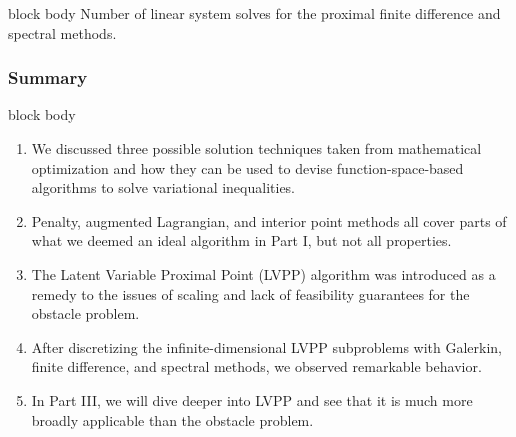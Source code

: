 \documentclass[aspectratio=169,xcolor=dvipsnames,11pt]{beamer}
\begin{document}
\begin{frame}
{\begin{minipage}{0.7\linewidth}
\begin{beamercolorbox}[rounded=true, shadow=true, wd=\textwidth]{block body}
\scriptsize
Number of linear system solves for the proximal finite difference and spectral methods.
\end{beamercolorbox}
\end{minipage}%
\begin{minipage}{0.3\linewidth}
 \centering
\begin{figure}
	\centering
\end{figure}
\end{minipage}
}
 \end{frame}

\begin{frame}\frametitle{Summary}
\begin{beamercolorbox}[rounded=true, shadow=true, wd=\textwidth]{block body}
\begin{enumerate}
\item We discussed three possible solution techniques taken from mathematical optimization and how they can be used to devise function-space-based algorithms to solve variational inequalities.
\item Penalty, augmented Lagrangian, and interior point methods all cover parts of what we deemed an ideal algorithm in Part I, but not all properties.
\item The Latent Variable Proximal Point (LVPP) algorithm was introduced as a remedy to the issues of scaling and lack of feasibility guarantees for the obstacle problem.
\item After discretizing the infinite-dimensional LVPP subproblems with Galerkin, finite difference, and spectral methods, we observed remarkable behavior.
\item In Part III, we will dive deeper into LVPP and see that it is much more broadly applicable than the obstacle problem.
\end{enumerate}
\end{beamercolorbox}
\end{frame}
\end{document}
